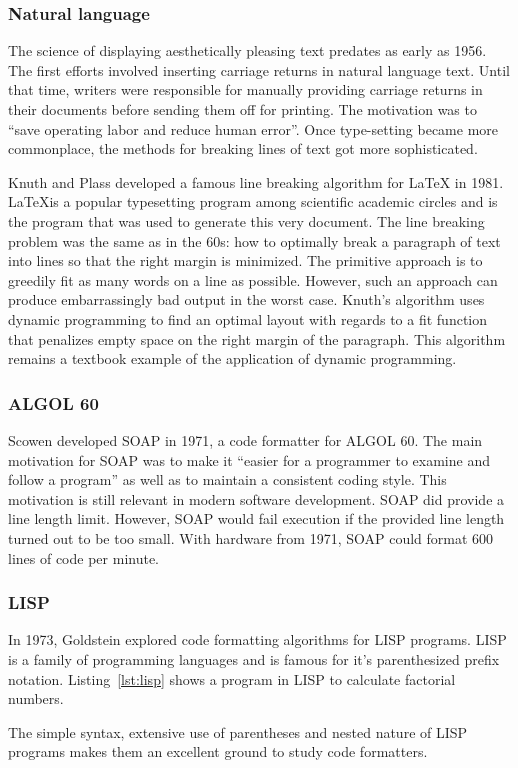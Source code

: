 \subsubsection{Natural language}
The science of displaying aesthetically pleasing text predates as early as 1956\autocite{harris_keyboard_1956}.
The first efforts involved inserting carriage returns in natural language text.
Until that time, writers were responsible for manually providing carriage returns in their documents before sending them off for printing.
The motivation was to ``save operating labor and reduce human error''.
Once type-setting became more commonplace, the methods for breaking lines of text got more sophisticated.

Knuth and Plass developed a famous line breaking algorithm\autocite{knuth_breaking_1981} for \LaTeX{} in 1981.
\LaTeX is a popular typesetting program among scientific academic circles and is the program that was used to generate this very document.
The line breaking problem was the same as in the 60s: how to optimally break a paragraph of text into lines so that the right margin is minimized.
The primitive approach is to greedily fit as many words on a line as possible.
However, such an approach can produce embarrassingly bad output in the worst case.
Knuth's algorithm uses dynamic programming to find an optimal layout with regards to a fit function that penalizes empty space on the right margin of the paragraph.
This algorithm remains a textbook example of the application of dynamic programming\autocite{dreyfus2002richard}.

\subsubsection{ALGOL 60}
Scowen\autocite{scowen_soapprogram_1971} developed SOAP in 1971, a code formatter for ALGOL 60.
The main motivation for SOAP was to make it ``easier for a programmer to examine and follow a program'' as well as to maintain a consistent coding style.
This motivation is still relevant in modern software development.
SOAP did provide a line length limit.
However, SOAP would fail execution if the provided line length turned out to be too small.
With hardware from 1971, SOAP could format 600 lines of code per minute.

\subsubsection{LISP}
In 1973, Goldstein\autocite{goldstein_pretty-printing_1973} explored code formatting algorithms for LISP\autocite{mccarthy_recursive_1960} programs.
LISP is a family of programming languages and is famous for it's parenthesized prefix notation.
Listing~\ref{lst:lisp} shows a program in LISP to calculate factorial numbers.

The simple syntax, extensive use of parentheses and nested nature of LISP programs makes them an excellent ground to study code formatters.

